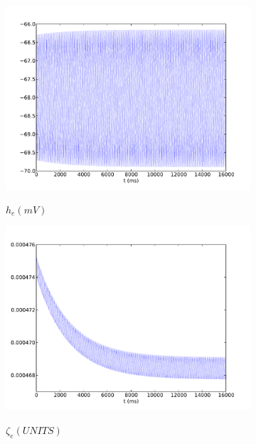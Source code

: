 \documentclass[a4paper,12pt]{article}
\begin{document}
\begin{figure}
	\begin{subfigure}[b]{0.5\textwidth}
		\includegraphics[scale=0.35]{chosen-frontiers-2012/00460-3-he-intra.pdf}
		\label{fig:460_a}
		\caption{$h_e (mV)$}
	\end{subfigure}
	\begin{subfigure}[b]{0.5\textwidth}
		\includegraphics[scale=0.35]{chosen-frontiers-2012/00460-3-slow-intra.pdf}
		\label{fig:460_b}
		\caption{$\zeta_e (UNITS)$}
	\end{subfigure}
	\begin{subfigure}[b]{0.5\textwidth}

\end{subfigure}
\end{figure}
\end{document}
